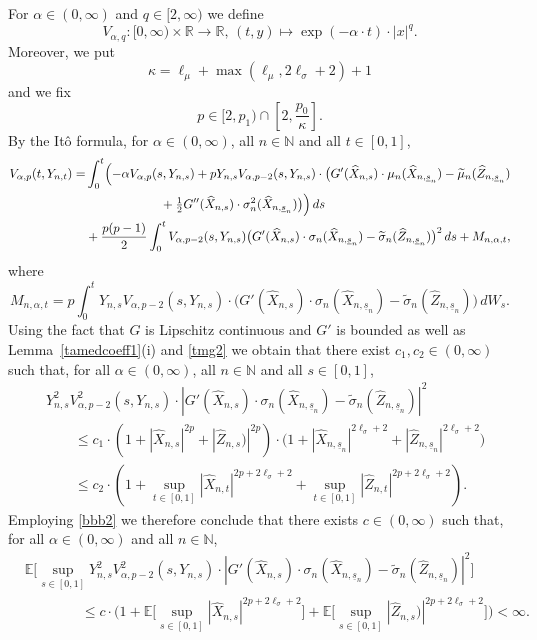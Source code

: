 \documentclass[11pt]{amsart}
\newcommand{\R}{{\mathbb R}}
\newcommand{\N}{{\mathbb N}}
\newcommand{\EE}{{\mathbb E}}
\newcommand{\eul}{{\widehat X}}
\newcommand{\eultr}{{\widehat Z}}
\newcommand{\usn}{\underline {s}_n}
\theoremstyle{plain}
\theoremstyle{definition}
\begin{document}
For  $\alpha\in (0,\infty)$ and  $q\in [2, \infty)$ we define
\[
V_{\alpha,q} \colon [0,\infty) \times \R \to \R, \, (t,y) \mapsto \exp(-\alpha\cdot t)\cdot |x|^q.
\]
Moreover, we put
\[
\kappa = \ell_\mu + \max(\ell_\mu, 2\ell_\sigma +2)+ 1
\]
and we fix
\begin{equation}\label{parp}
p\in [2,p_1)\cap [2,\frac{p_0}{\kappa}].
\end{equation}
By the It\^{o} formula, for $\alpha\in(0, \infty)$,
all $n\in\N$ and all $t\in[0,1]$,
\begin{align*}
	V_{\alpha,p}(t,Y_{n,t})= & \int_0^t \Bigl(-\alpha V_{\alpha,p}(s,Y_{n,s}) + p Y_{n,s} V_{\alpha,p-2}(s,Y_{n,s})\cdot \bigl(G'(\eul_{n,s})\cdot  \mu_n(\eul_{n,\usn}) - \widetilde \mu_n(\eultr_{n,\usn}) \\& \qquad\qquad \qquad +\tfrac{1}{2}G''(\eul_{n,s})\cdot\sigma_n^2(\eul_{n,\usn})\bigr) \Bigr)\, ds \nonumber\\
	& + \frac{p(p-1)}{2} \int_0^t V_{\alpha,p-2}(s,Y_{n,s})\bigl( G'(\eul_{n,s})\cdot\sigma_n(\eul_{n,\usn}) -\widetilde \sigma_n(\eultr_{n,\usn})  \bigr)^2\, ds + M_{n,\alpha,t},
\end{align*}
where
\[
M_{n,\alpha,t}= p\int_0^t  Y_{n,s} V_{\alpha,p-2}(s,Y_{n,s})\cdot\bigl( G'(\eul_{n,s})\cdot\sigma_n(\eul_{n,\usn}) -\widetilde \sigma_n(\eultr_{n,\usn})  \bigr) \,dW_s.
\]
Using the fact that $G$ is Lipschitz continuous and  $G'$ is bounded as well as
Lemma~\ref{tamedcoeff1}(i)  and \eqref{tmg2} we obtain that there exist $c_1,c_2\in (0,\infty)$ such that, for all $\alpha\in(0, \infty)$,
all $n\in\N$ and all $s\in[0,1]$,
\begin{align*}
	&	 Y^2_{n,s} V^2_{\alpha, p-2}(s,Y_{n,s})\cdot |G'(\widehat X_{n,s})\cdot\sigma_n(\eul_{n,\usn}) -\widetilde \sigma_n(\eultr_{n,\usn})|^2 \\
	& \qquad  \le  c_1\cdot (1+|\widehat X_{n,s}|^{2p}  + |\eultr_{n,s})|^{2p})\cdot\bigl(1+|\eul_{n,\usn}|^{2\ell_\sigma + 2} +  |\eultr_{n,\usn}|^{2\ell_\sigma +2}\bigr) \\
	& \qquad  \le  c_2\cdot (1+\sup_{t\in[0,1]}|\widehat X_{n,t}|^{2p+2\ell_\sigma + 2}  + \sup_{t\in[0,1]}|\eultr_{n,t}|^{2p+2\ell_\sigma + 2}).
\end{align*}
Employing \eqref{bbb2} we therefore conclude that there exists $c\in (0,\infty)$ such that, for all  $\alpha\in(0, \infty)$ and all $n\in\N$,
\begin{align*}
&	\EE\bigl[\sup_{s\in[0,1]} Y^2_{n,s} V^2_{\alpha, p-2}(s,Y_{n,s})\cdot |G'(\widehat X_{n,s})\cdot\sigma_n(\eul_{n,\usn}) -\widetilde \sigma_n(\eultr_{n,\usn})|^2\bigr] \\
& \qquad \qquad \le  c\cdot	\bigl( 1 + \EE\bigl[\sup_{s\in[0,1]} |\widehat X_{n,s}|^{2p+2\ell_\sigma + 2}\bigr]  + \EE\bigl[\sup_{s\in[0,1]} |\eultr_{n,s})|^{2p+2\ell_\sigma + 2}\bigr]\bigr) < \infty.
\end{align*}
\end{document}
